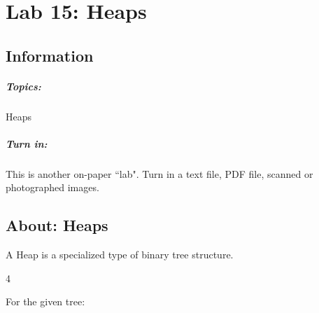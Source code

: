 \documentclass[a4paper,12pt,oneside]{book}
\title{}
\author{Rachel Morris}
\date{\today}
\newcommand{\laLab}{Lab 15: Heaps\ }
\newcounter{question}
\begin{document}
    \chapter*{\laLab} 

        \section{Information}
            \paragraph{ Topics: } Heaps
            \paragraph{ Turn in: } This is another on-paper ``lab". Turn in a text file, PDF file, scanned or photographed images.
            

    \hrulefill

    \section{About: Heaps}

    A Heap is a specialized type of binary tree structure. 

    \hrulefill

    \begin{question}{\thequestion}{4}

        For the given tree:
        
        \begin{center}
        \end{center}
        
    \end{question}
\end{document}
